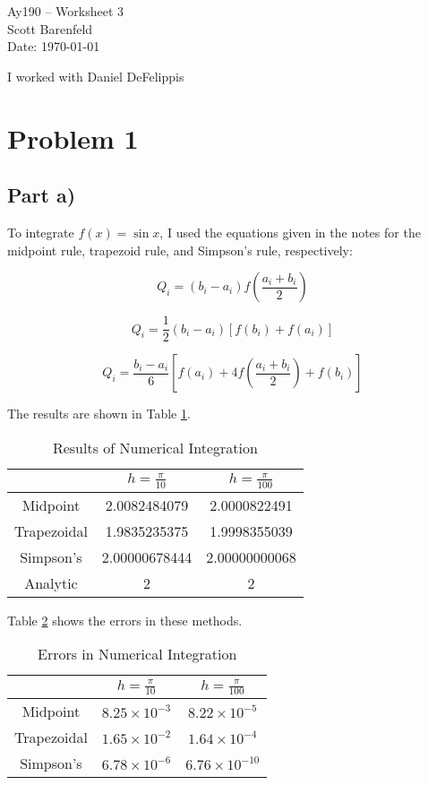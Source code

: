 \documentclass[11pt,letterpaper]{article}
\begin{document}
\begin{center}
\Large
Ay190 -- Worksheet 3\\
Scott Barenfeld\\
Date: \today
\end{center}

I worked with Daniel DeFelippis
\section{Problem 1}
\subsection{Part a)}
To integrate $f(x)=\sin{x}$, I used the equations given in the notes 
for the midpoint rule, trapezoid rule, and Simpson's rule, 
respectively:

\begin{equation}
Q_i=(b_i-a_i)f\left(\frac{a_i+b_i}{2}\right)
\end{equation}

\begin{equation}
Q_i=\frac{1}{2}(b_i-a_i)[f(b_i)+f(a_i)]
\end{equation}

\begin{equation}
Q_i=\frac{b_i-a_i}{6}\left[f(a_i)+4f\left(\frac{a_i+b_i}{2}\right)+f(b_i)\right]
\end{equation}

The results are shown in Table \ref{tab:onea}.

\begin{table}[!h]
\centering
\caption{Results of Numerical Integration}
\begin{tabular}{c|c|c}
\hline
 & $h=\frac{\pi}{10}$ & $h=\frac{\pi}{100}$\\
\hline
Midpoint & 2.0082484079 & 2.0000822491\\
Trapezoidal & 1.9835235375 & 1.9998355039\\
Simpson's & 2.00000678444 & 2.00000000068\\
Analytic & 2 & 2\\
\hline
\end{tabular}
\label{tab:onea}
\end{table}

Table \ref{tab:onea2} shows the errors in these methods.

\begin{table}[!h]
\centering
\caption{Errors in Numerical Integration}
\begin{tabular}{c|c|c}
\hline
 & $h=\frac{\pi}{10}$ & $h=\frac{\pi}{100}$\\
\hline
Midpoint & $8.25\times10^{-3}$ & $8.22\times10^{-5}$\\
Trapezoidal & $1.65\times10^{-2}$ & $1.64\times10^{-4}$\\
Simpson's & $6.78\times10^{-6}$ & $6.76\times10^{-10}$\\
\hline
\end{tabular}
\label{tab:onea2}
\end{table}
\end{document}
